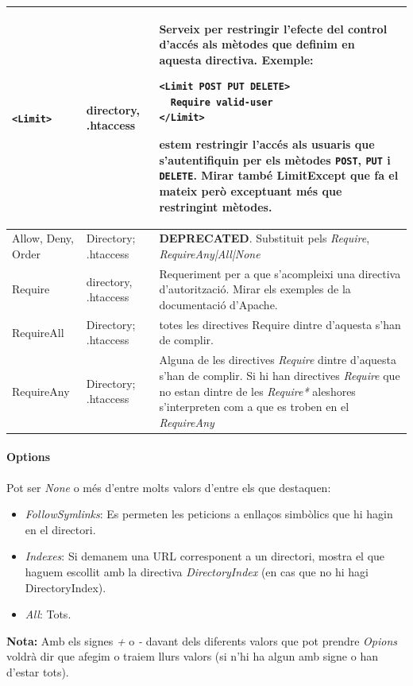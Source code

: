 \documentclass[a4paper, 11pt]{article}
\begin{document}
\begin{longtable}{|p{4cm}|p{3cm}|p{5cm}|}
\verb+<Limit>+ & directory, .htaccess & Serveix per restringir l'efecte 
del control d'accés als mètodes que definim en aquesta directiva. 
Exemple:
\begin{verbatim}
<Limit POST PUT DELETE>
  Require valid-user
</Limit>
\end{verbatim}
estem restringir l'accés als usuaris que s'autentifiquin 
per els mètodes \verb+POST+, \verb+PUT+ i \verb+DELETE+. Mirar també LimitExcept que fa el mateix però exceptuant més que restringint mètodes. \\
\hline
Allow, Deny, Order & Directory; .htaccess& \textbf{DEPRECATED}. Substituit pels \textit{Require}, \textit{RequireAny|All|None} \\
\hline
Require & directory, .htaccess & Requeriment per a que s'acompleixi una directiva d'autorització. Mirar els exemples de la documentació d'Apache. \\
\hline
RequireAll & Directory; .htaccess & totes les directives Require dintre d'aquesta s'han de complir. \\
\hline
RequireAny & Directory; .htaccess & Alguna de les directives \textit{Require} dintre d'aquesta s'han de complir. Si hi han directives \textit{Require} que no estan dintre de les \textit{Require*} aleshores s'interpreten com a que es troben en el \textit{RequireAny}\\
\hline
\end{longtable}

\paragraph{Options}
Pot ser \textit{None} o m\'es d'entre molts valors d'entre els que destaquen:

\begin{itemize}
	\item \textit{FollowSymlinks}: Es permeten les peticions a enllaços simbòlics que hi hagin en el directori.
	\item \textit{Indexes}: Si demanem una URL corresponent a un directori, mostra el que haguem escollit amb la directiva \textit{DirectoryIndex} (en cas que no hi hagi DirectoryIndex).
	\item \textit{All}: Tots.
\end{itemize}

\textbf{Nota:} Amb els signes \textit{+} o \textit{-} davant dels diferents valors que pot prendre \textit{Opions} voldrà dir que afegim o traiem llurs valors (si n'hi ha algun amb signe o han d'estar tots).
\end{document}
